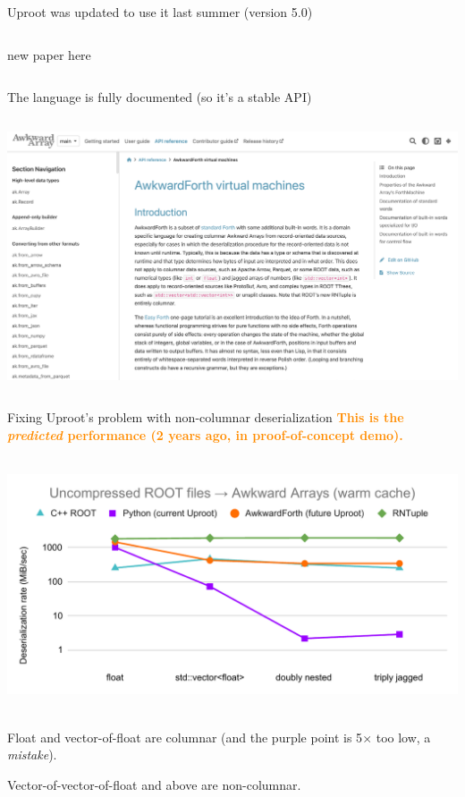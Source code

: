 \documentclass[aspectratio=169]{beamer}
\begin{document}
\begin{frame}{Uproot was updated to use it last summer (version 5.0)}
\vspace{0.17 cm}
\begin{columns}
new paper here
\end{columns}
\end{frame}

\begin{frame}{The language is fully documented (so it's a stable API)}
\vspace{0.17 cm}
\begin{columns}
\includegraphics[width=\linewidth]{PLOTS/AwkwardForth-documentation.png}
\end{columns}
\end{frame}

\begin{frame}{Fixing Uproot's problem with non-columnar deserialization}
\vspace{0.25 cm}
\textcolor{darkorange}{\bf \centering This is the {\it predicted} performance (2 years ago, in proof-of-concept demo).}

\mbox{ } \hfill \includegraphics[width=0.9\linewidth]{PLOTS/AwkwardForth-performance-ROOT.pdf} \hfill \mbox{ }

Float and vector-of-float are columnar (and the purple point is 5$\times$ too low, a {\it mistake}).

Vector-of-vector-of-float and above are non-columnar.
\end{frame}
\end{document}
